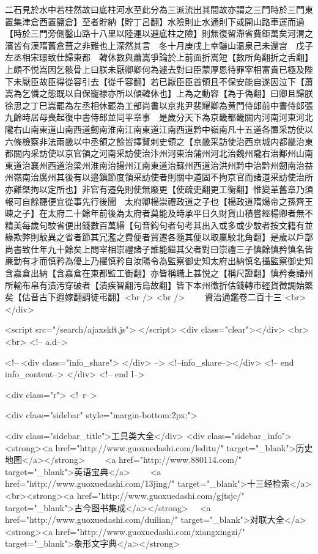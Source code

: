 二石見於水中若柱然故曰底柱河水至此分為三派流出其間故亦謂之三門時於三門東置集津倉西置鹽倉】至者貯納【貯丁呂翻】水險則止水通則下或開山路車運而過【時於三門旁側鑿山路十八里以陸運以避底柱之險】則無復留滯省費鉅萬矣河渭之濱皆有漢隋舊倉葺之非難也上深然其言　冬十月庚戌上幸驪山温泉己未還宫　戊子左丞相宋璟致仕歸東都　韓休數與蕭嵩爭論於上前面折嵩短【數所角翻折之舌翻】上頗不悦嵩因乞骸骨上曰朕未厭卿卿何為遽去對曰臣蒙厚恩待罪宰相富貴已極及陛下未厭臣故臣得從容引去【從千容翻】若已厭臣臣首領且不保安能自遂因泣下【蕭嵩為乞憐之態既以自保寵禄亦所以傾韓休也】上為之動容【為于偽翻】曰卿且歸朕徐思之丁巳嵩罷為左丞相休罷為工部尚書以京兆尹裴耀卿為黄門侍郎前中書侍郎張九齡時居母喪起復中書侍郎並同平章事　是歲分天下為京畿都畿關内河南河東河北隴右山南東道山南西道劒南淮南江南東道江南西道黔中嶺南凡十五道各置采訪使以六條檢察非法兩畿以中丞領之餘皆擇賢刺史領之【京畿采訪使治西京城内都畿治東都關内采訪使以京官領之河南采訪使治汴州河東治蒲州河北治魏州隴右治鄯州山南東道治襄州西道治梁州淮南治揚州江南東道治蘇州西道治洪州黔中治黔州劒南治益州嶺南治廣州其後有以邉鎮節度領采訪使者則關中道固不拘京官而諸道采訪使治所亦難槩拘以定所也】非官有遷免則使無廢更【使疏吏翻更工衡翻】惟變革舊章乃須報可自餘聽便宜從事先行後聞　太府卿楊崇禮政道之子也【楊政道隋煬帝之孫齊王暕之子】在太府二十餘年前後為太府者莫能及時承平日久財貨山積嘗經楊卿者無不精美每歲句駮省便出錢數百萬緡【句音鈎句者句考其出入或多或少駮者按文籍有並緣欺弊則駮異之省者節其冗濫之費便者貿遷各隨其便以取贏駮北角翻】是歲以戶部尚書致仕年九十餘矣上問宰相崇禮諸子誰能繼其父者對曰崇禮三子慎餘慎矜慎名皆亷勤有才而慎矜為優上乃擢慎矜自汝陽令為監察御史知太府出納慎名攝監察御史知含嘉倉出納【含嘉倉在東都監工衘翻】亦皆稱職上甚悦之【稱尺證翻】慎矜奏諸州所輸布帛有漬汚穿破者【漬疾智翻汚烏故翻】皆下本州徵折估錢轉市輕貨徵調始繁矣【估音古下遐嫁翻調徒弔翻】<br />
<br />
　　資治通鑑卷二百十三  <br>
   </div> 

<script src="/search/ajaxskft.js"> </script>
 <div class="clear"></div>
<br>
<br>
 <!-- a.d-->

 <!--
<div class="info_share">
</div> 
-->
 <!--info_share--></div>   <!-- end info_content-->
  </div> <!-- end l-->

<div class="r">   <!--r-->



<div class="sidebar"  style="margin-bottom:2px;">

 
<div class="sidebar_title">工具类大全</div>
<div class="sidebar_info">
<strong><a href="http://www.guoxuedashi.com/lsditu/" target="_blank">历史地图</a></strong>　　
<a href="http://www.880114.com/" target="_blank">英语宝典</a>　　
<a href="http://www.guoxuedashi.com/13jing/" target="_blank">十三经检索</a>　
<br><strong><a href="http://www.guoxuedashi.com/gjtsjc/" target="_blank">古今图书集成</a></strong>　
<a href="http://www.guoxuedashi.com/duilian/" target="_blank">对联大全</a>　<strong><a href="http://www.guoxuedashi.com/xiangxingzi/" target="_blank">象形文字典</a></strong>　

